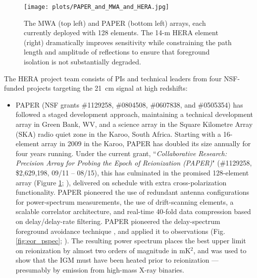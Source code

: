 \documentclass[preprint]{aastex}
\newcommand{\Mycitep}[1]{{\bf \citep{#1}}}
\newcommand{\Mycitealt}[1]{{\bf \citealt{#1}}}
\newcommand{\Caption}[4]{\vspace{#1}\renewcommand{\baselinestretch}{#2}\caption{#4}\vspace{#3}}
\begin{document}
\begin{figure}[t]\centering
\texttt{[image: plots/PAPER\_and\_MWA\_and\_HERA.jpg]}
\Caption{-0.25in}{0.99}{-0.15in}{\small
The MWA (top left) and PAPER (bottom left) arrays, each currently deployed with 128 elements.
The 14-m HERA element (right) dramatically improves sensitivity while 
constraining the path length and amplitude of reflections to ensure that foreground
isolation is not substantially degraded.
}
\label{fig:hera_dish}
\end{figure}


The HERA project team consists of PIs and technical leaders from four NSF-funded projects targeting the 21~cm signal
at high redshifts:
\begin{itemize}[noitemsep,nolistsep]

\item{PAPER} (NSF grants \#1129258, \#0804508, \#0607838, and \#0505354) has followed a
staged development approach, maintaining a technical development array in Green Bank, WV, and
a science array in the Square Kilometre Array (SKA) radio quiet zone in the Karoo, South Africa.  Starting with a 16-element
array in 2009 in the Karoo, PAPER has doubled its size annually for four years running. 
Under the current grant,
``{\it Collaborative Research: Precision Array for Probing the Epoch of Reionization (PAPER)}"
(\#1129258, \$2,629,198, 09/11 -- 08/15),
this has culminated in the promised
128-element array (Figure \ref{fig:hera_dish}; \Mycitealt{parsons_et_al2012a}), delivered
on schedule with extra cross-polarization functionality.
PAPER pioneered the use of redundant antenna configurations
for power-spectrum measurements, the use of drift-scanning elements,
a scalable correlator architecture,
and real-time 40-fold data compression based on delay/delay-rate filtering.
PAPER pioneered the delay-spectrum foreground avoidance technique \Mycitep{parsons_et_al2012b},
and applied it to observations (Fig. \ref{fig:eor_pspec}; \Mycitealt{parsons_et_al2013}).
The resulting power spectrum places the best upper
limit on reionization by almost two orders of magnitude in mK$^2$, and was used to show that the IGM must have
been heated prior to reionization --- presumably by emission from high-mass X-ray binaries.


\end{itemize}
\end{document}
